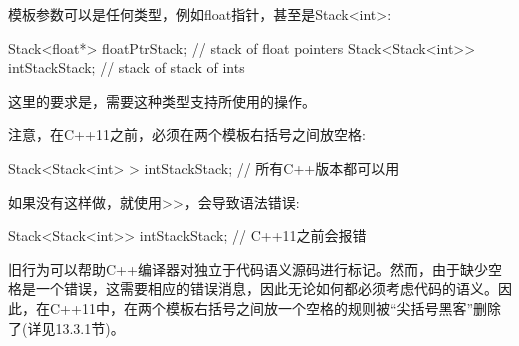 模板参数可以是任何类型，例如float指针，甚至是Stack<int>:

\begin{cpp}
Stack<float*> floatPtrStack; // stack of float pointers
Stack<Stack<int>> intStackStack; // stack of stack of ints
\end{cpp}

这里的要求是，需要这种类型支持所使用的操作。

注意，在C++11之前，必须在两个模板右括号之间放空格:

\begin{cpp}
Stack<Stack<int> > intStackStack; // 所有C++版本都可以用
\end{cpp}

如果没有这样做，就使用>{}>，会导致语法错误:

\begin{cpp}
Stack<Stack<int>> intStackStack; // C++11之前会报错
\end{cpp}

旧行为可以帮助C++编译器对独立于代码语义源码进行标记。然而，由于缺少空格是一个错误，这需要相应的错误消息，因此无论如何都必须考虑代码的语义。因此，在C++11中，在两个模板右括号之间放一个空格的规则被“尖括号黑客”删除了(详见13.3.1节)。





















